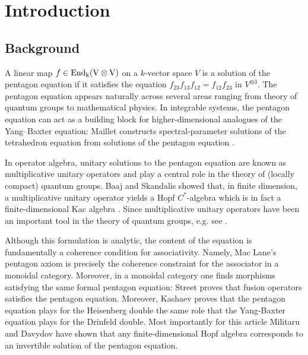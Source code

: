 \documentclass[a4paper,10pt]{amsart}
\theoremstyle{definition}
\theoremstyle{remark}
\newcommand\End{\rm End}
\newcommand\ot{\otimes}
\begin{document}
\tableofcontents


\section{Introduction}
\subsection{Background}
A linear map $f \in \End_k(V\ot V)$ on a $k$-vector space $V$ is a solution of the pentagon equation if it satisfies the equation $f_{23} f_{13} f_{12} = f_{12} f_{23}$ in $V^{\ot 3}$. 
The pentagon equation appears naturally across several areas ranging from theory of quantum groups to mathematical physics.
In integrable systems, the pentagon equation can act as a building block for higher-dimensional analogues of the Yang–Baxter equation: Maillet constructs spectral-parameter solutions of the tetrahedron equation from solutions of the pentagon equation \cite{zbMATH00721651}.

In operator algebra, unitary solutions to the pentagon equation are known as multiplicative unitary operators and play a central role in the theory of (locally compact) quantum groups. Baaj and Skandalis showed that, in finite dimension, a multiplicative unitary operator yields a Hopf $C^*$-algebra which is in fact a finite-dimensional Kac algebra \cite[theorem 4.10]{BaSk}. Since multiplicative unitary operators have been an important tool in the theory of quantum groups, e.g. see \cite{Wo96, zbMATH01594092}.

Although this formulation is analytic, the content of the equation is fundamentally a coherence condition for associativity.
Namely, Mac Lane's pentagon axiom \cite{maclane} is precisely the coherence constraint for the associator in a monoidal category. Moreover, in a monoidal category one finds morphisms satisfying the same formal pentagon equation: Street 
\cite{St98} proves that fusion operators satisfies the pentagon equation. 
Moreover, Kashaev \cite{Ka96} proves that the pentagon equation plays for the Heisenberg double the same role that the Yang-Baxter equation plays for the Drinfeld double. Most importantly for this article Militaru \cite{Mi04} and Davydov \cite{Dav} have shown that any finite-dimensional Hopf algebra corresponds to an invertible solution of the pentagon equation.
\end{document}
